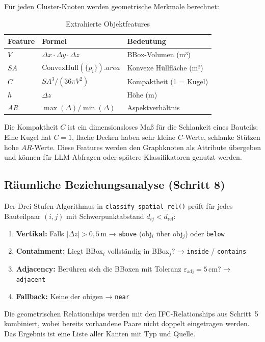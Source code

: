 \documentclass[a4paper,11pt]{article}
\begin{document}
Für jeden Cluster-Knoten werden geometrische Merkmale berechnet:

\begin{table}[H]
\centering
\caption{Extrahierte Objektfeatures}
\begin{tabular}{lll}
\toprule
\textbf{Feature} & \textbf{Formel} & \textbf{Bedeutung} \\
\midrule
$V$ & $\Delta x \cdot \Delta y \cdot \Delta z$ & BBox-Volumen (m³) \\
$SA$ & $\text{ConvexHull}(\{p_i\}).area$ & Konvexe Hüllfläche (m²) \\
$C$ & $SA^3 / (36\pi V^2)$ & Kompaktheit (1 = Kugel) \\
$h$ & $\Delta z$ & Höhe (m) \\
$AR$ & $\max(\Delta) / \min(\Delta)$ & Aspektverhältnis \\
\bottomrule
\end{tabular}
\end{table}

Die Kompaktheit $C$ ist ein dimensionsloses Maß für die Schlankeit eines Bauteils: Eine Kugel hat $C = 1$, flache Decken haben sehr kleine $C$-Werte, schlanke Stützen hohe $AR$-Werte. Diese Features werden den Graphknoten als Attribute übergeben und können für LLM-Abfragen oder spätere Klassifikatoren genutzt werden.

\subsection{Räumliche Beziehungsanalyse (Schritt 8)}

Der Drei-Stufen-Algorithmus in \texttt{classify\_spatial\_rel()} prüft für jedes Bauteilpaar $(i, j)$ mit Schwerpunktabstand $d_{ij} < d_\text{rel}$:

\begin{enumerate}[noitemsep]
  \item \textbf{Vertikal:} Falls $|\Delta z| > 0{,}5$\,m → \texttt{above} (obj$_i$ über obj$_j$) oder \texttt{below}
  \item \textbf{Containment:} Liegt BBox$_i$ vollständig in BBox$_j$? → \texttt{inside} / \texttt{contains}
  \item \textbf{Adjacency:} Berühren sich die BBoxen mit Toleranz $\varepsilon_\text{adj} = 5$\,cm? → \texttt{adjacent}
  \item \textbf{Fallback:} Keine der obigen → \texttt{near}
\end{enumerate}

Die geometrischen Relationships werden mit den IFC-Relationships aus Schritt~5 kombiniert, wobei bereits vorhandene Paare nicht doppelt eingetragen werden. Das Ergebnis ist eine Liste aller Kanten mit Typ und Quelle.
\end{document}
